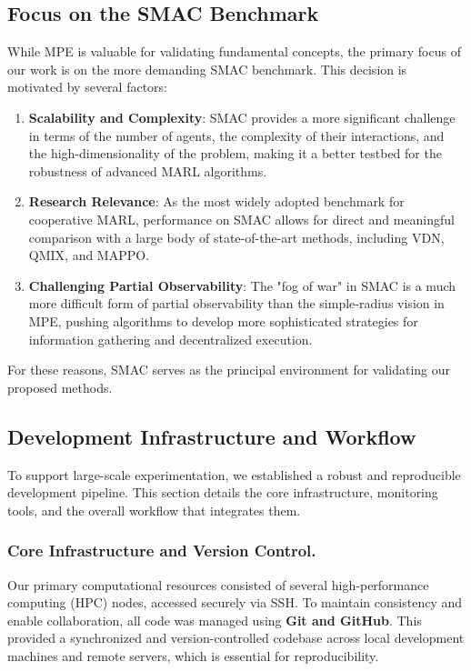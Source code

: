 \documentclass[../Main.tex]{subfiles}
\begin{document}
\subsection{Focus on the SMAC Benchmark}
While MPE is valuable for validating fundamental concepts, the primary focus of our work is on the more demanding SMAC benchmark. This decision is motivated by several factors:
\begin{enumerate}
    \item \textbf{Scalability and Complexity}: SMAC provides a more significant challenge in terms of the number of agents, the complexity of their interactions, and the high-dimensionality of the problem, making it a better testbed for the robustness of advanced MARL algorithms.
    \item \textbf{Research Relevance}: As the most widely adopted benchmark for cooperative MARL, performance on SMAC allows for direct and meaningful comparison with a large body of state-of-the-art methods, including VDN, QMIX, and MAPPO.
    \item \textbf{Challenging Partial Observability}: The "fog of war" in SMAC is a much more difficult form of partial observability than the simple-radius vision in MPE, pushing algorithms to develop more sophisticated strategies for information gathering and decentralized execution.
\end{enumerate}
For these reasons, SMAC serves as the principal environment for validating our proposed methods.

\subsection{Development Infrastructure and Workflow}

To support large-scale experimentation, we established a robust and reproducible development pipeline. This section details the core infrastructure, monitoring tools, and the overall workflow that integrates them.

\subsubsection{Core Infrastructure and Version Control.}
Our primary computational resources consisted of several high-performance computing (HPC) nodes, accessed securely via SSH. To maintain consistency and enable collaboration, all code was managed using \textbf{Git and GitHub}. This provided a synchronized and version-controlled codebase across local development machines and remote servers, which is essential for reproducibility.
\end{document}
